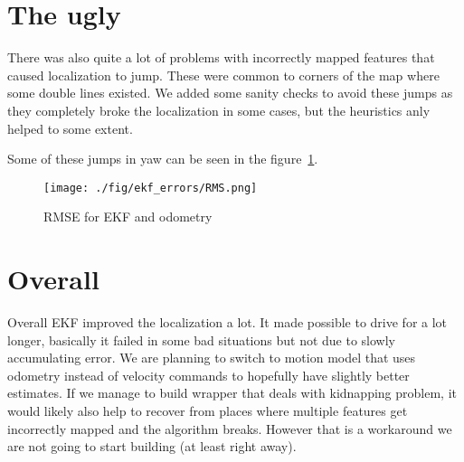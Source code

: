 \documentclass[12pt, a4paper, onecolumn]{article}
\begin{document}
\newpage
\section{The ugly}

There was also quite a lot of problems with incorrectly mapped features that caused localization to jump.
These were common to corners of the map where some double lines existed.
We added some sanity checks to avoid these jumps as they completely broke the localization in some cases, but the heuristics anly helped to some extent.

Some of these jumps in yaw can be seen in the figure~\ref{fig:rmse}.

\begin{figure}[h!]
  \begin{center}
    \texttt{[image: ./fig/ekf\_errors/RMS.png]}
  \end{center}
  \caption{RMSE for EKF and odometry}
  \label{fig:rmse}
\end{figure}

\newpage
\section{Overall}
Overall EKF improved the localization a lot.
It made possible to drive for a lot longer, basically it failed in some bad situations but not due to slowly accumulating error.
We are planning to switch to motion model that uses odometry instead of velocity commands to hopefully have slightly better estimates.
If we manage to build wrapper that deals with kidnapping problem, it would likely also help to recover from places where multiple features get incorrectly
mapped and the algorithm breaks.
However that is a workaround we are not going to start building (at least right away).
\end{document}
